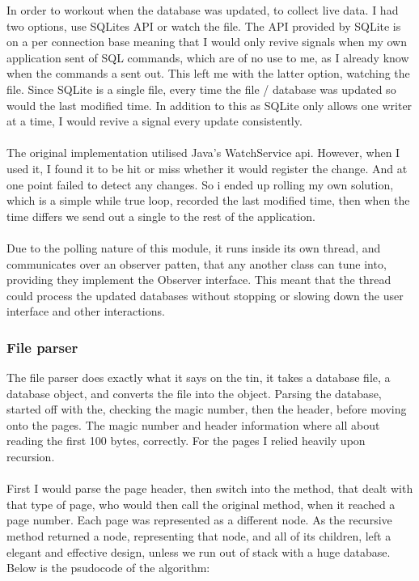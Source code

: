 In order to workout when the database was updated, to collect live data. I had two options, use SQLites API or watch the file. The API provided by SQLite is on a per connection base meaning that I would only revive signals when my own application sent of SQL commands, which are of no use to me, as  I already know when the commands a sent out. This left me with the latter option, watching the file. Since SQLite is a single file, every time the file / database was updated so would the last modified time. In addition to this as SQLite only allows one writer at a time, I would revive a signal every update consistently.  
\\\\
The original implementation utilised Java's WatchService api. However, when I used it, I found it to be hit or miss whether it would register the change. And at one point failed to detect any changes. So i ended up rolling my own solution, which is a simple while true loop, recorded the last modified time, then when the time differs we send out a single to the rest of the application. 
\\\\
Due to the polling nature of this module, it runs inside its own thread, and communicates over an observer patten, that any another class can tune into, providing they implement the Observer interface. This meant that the thread could process the updated databases without stopping or slowing down the user interface and other interactions.

\subsubsection{File parser}
\label{subsubsec:file_parser_imp}

The file parser does exactly what it says on the tin, it takes a database file, a database object, and converts the file into the object. Parsing the database, started off with the, checking the magic number, then the header, before moving onto the pages. The magic number and header information where all about reading the first 100 bytes, correctly. For the pages I relied heavily upon recursion.
\\\\
First I would parse the page header, then switch into the method, that dealt with that type of page, who would then call the original method, when it reached a page number.  Each page was represented as a different node. As the recursive method returned a node, representing that node, and all of its children, left a elegant and effective design, unless we run out of stack with a huge database. Below is the psudocode of the algorithm:

